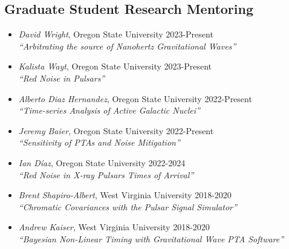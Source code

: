 \documentclass[11pt,letterpaper,sans,unicode]{moderncv}
\newcommand{\studentitem}[4]{\item \textit{#1}, {#2} \hfill{#3} \\ \textit{``#4''} } %
\newcommand{\blucirc}{{\color{color1} $\circ\;\;$}}
\begin{document}

\subsection{Graduate Student Research Mentoring}
\renewcommand\labelitemi{\blucirc}
\begin{itemize}[leftmargin=8mm]
	\studentitem{David Wright}{Oregon State University}{2023-Present}{Arbitrating the source of Nanohertz Gravitational Waves}
	\studentitem{Kalista Wayt}{Oregon State University}{2023-Present}{Red Noise in Pulsars}
	\studentitem{Alberto Diaz Hernandez}{Oregon State University}{2022-Present}{Time-series Analysis of Active Galactic Nuclei}
	\studentitem{Jeremy Baier}{Oregon State University}{2022-Present}{Sensitivity of PTAs and Noise Mitigation}
	\studentitem{Ian D\'iaz}{Oregon State University}{2022-2024}{Red Noise in X-ray Pulsars Times of Arrival}
	\studentitem{Brent Shapiro-Albert}{West Virginia University}{2018-2020}{Chromatic Covariances with the Pulsar Signal Simulator}
	\studentitem{Andrew Kaiser}{West Virginia University}{2018-2020}{Bayesian Non-Linear Timing with Gravitational Wave PTA Software}
\end{itemize}
\end{document}

